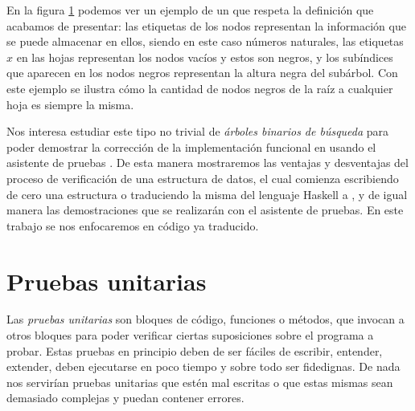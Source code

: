 \begin{figure}[!ht]
\centering
\captionsetup{justification=centering}
\caption {\Arn}
\label{arbolRB_1}
\end{figure}

En la figura \ref{arbolRB_1} podemos ver un ejemplo de un {\arn} que respeta la definici\'on que
acabamos de presentar: las etiquetas de los nodos representan la informaci\'on que se puede 
almacenar en ellos, siendo en este caso n\'umeros naturales, las etiquetas $x$ en las hojas 
representan los nodos vacíos y estos son negros, y los subíndices que aparecen en los nodos 
negros representan la altura negra del sub\'arbol. Con este ejemplo se ilustra c\'omo la cantidad de 
nodos negros de la ra\'iz a cualquier hoja es siempre la misma.

Nos interesa estudiar este tipo no trivial de \textit{\'arboles binarios de búsqueda} para poder
demostrar la correcci\'on de la implementaci\'on funcional en \cite{tesisG} usando el asistente de 
pruebas {\coq}. De esta manera mostraremos las ventajas y desventajas del proceso de verificaci\'on de una estructura de datos, el cual 
comienza escribiendo de cero una estructura o traduciendo la misma del lenguaje Haskell a {\coq}, y 
de igual manera las demostraciones que se realizar\'an con el asistente de pruebas. En este trabajo se nos enfocaremos en c\'odigo ya traducido. 

\section{Pruebas unitarias}
Las \textit{pruebas unitarias} \cite{unittest} son bloques de c\'odigo, funciones o m\'etodos, que
invocan a otros bloques para poder verificar ciertas suposiciones sobre el programa a probar. Estas
pruebas en principio deben de ser fáciles de escribir, entender, extender, deben ejecutarse en poco
tiempo y sobre todo ser fidedignas. De nada nos servirían pruebas unitarias que estén mal
escritas o que estas mismas sean demasiado complejas y puedan contener errores.

